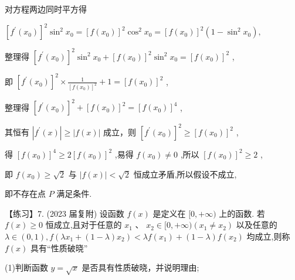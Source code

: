\documentclass[10pt]{article}
\begin{document}
对方程两边同时平方得

\({\left\lbrack  {f}^{\prime }\left( {x}_{0}\right) \right\rbrack  }^{2}{\sin }^{2}{x}_{0} = {\left\lbrack  f\left( {x}_{0}\right) \right\rbrack  }^{2}{\cos }^{2}{x}_{0} = {\left\lbrack  f\left( {x}_{0}\right) \right\rbrack  }^{2}\left( {1 - {\sin }^{2}{x}_{0}}\right) ,\)

整理得 \({\left\lbrack  {f}^{\prime }\left( {x}_{0}\right) \right\rbrack  }^{2}{\sin }^{2}{x}_{0} + {\left\lbrack  f\left( {x}_{0}\right) \right\rbrack  }^{2}{\sin }^{2}{x}_{0} = {\left\lbrack  f\left( {x}_{0}\right) \right\rbrack  }^{2}\) ,

即 \({\left\lbrack  {f}^{\prime }\left( {x}_{0}\right) \right\rbrack  }^{2} \times  \frac{1}{{\left\lbrack  f\left( {x}_{0}\right) \right\rbrack  }^{2}} + 1 = {\left\lbrack  f\left( {x}_{0}\right) \right\rbrack  }^{2}\) ,

整理得 \({\left\lbrack  {f}^{\prime }\left( {x}_{0}\right) \right\rbrack  }^{2} + {\left\lbrack  f\left( {x}_{0}\right) \right\rbrack  }^{2} = {\left\lbrack  f\left( {x}_{0}\right) \right\rbrack  }^{4}\) ,

其恒有 \(\left| {{f}^{\prime }\left( x\right) }\right|  \geq  \left| {f\left( x\right) }\right|\) 成立，则 \({\left\lbrack  {f}^{\prime }\left( {x}_{0}\right) \right\rbrack  }^{2} \geq  {\left\lbrack  f\left( {x}_{0}\right) \right\rbrack  }^{2}\) ,

得 \({\left\lbrack  f\left( {x}_{0}\right) \right\rbrack  }^{4} \geq  2{\left\lbrack  f\left( {x}_{0}\right) \right\rbrack  }^{2}\) ,易得 \(f\left( {x}_{0}\right)  \neq  0\) ,所以 \({\left\lbrack  f\left( {x}_{0}\right) \right\rbrack  }^{2} \geq  2\) ,

即 \(f\left( {x}_{0}\right)  \geq  \sqrt{2}\) 与 \(\left| {f\left( x\right) }\right|  < \sqrt{2}\) 恒成立矛盾,所以假设不成立,

即不存在点 \(P\) 满足条件.

【练习】7. (2023 届复附) 设函数 \(f\left( x\right)\) 是定义在 \(\lbrack 0, + \infty )\) 上的函数. 若 \(f\left( x\right)  \geq  0\) 恒成立,且对于任意的 \({x}_{1}\text{ 、 }{x}_{2} \in  \lbrack 0, + \infty )\left( {{x}_{1} \neq  {x}_{2}}\right)\) 以及任意的 \(\lambda  \in  \left( {0,1}\right) ,f\left( {\lambda {x}_{1} + \left( {1 - \lambda }\right) {x}_{2}}\right)  < {\lambda f}\left( {x}_{1}\right)  + \left( {1 - \lambda }\right) f\left( {x}_{2}\right)\) 均成立,则称 \(f\left( x\right)\) 具有“性质破晓”

(1)判断函数 \(y = \sqrt{x}\) 是否具有性质破晓，并说明理由;
\end{document}
